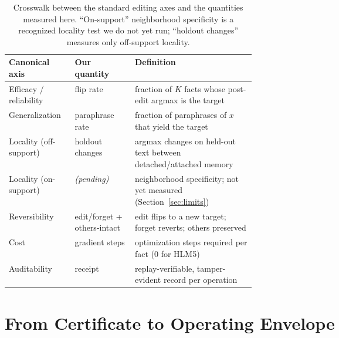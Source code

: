\documentclass[10pt,twocolumn]{article}
\theoremstyle{remark}
\begin{document}
\begin{table}[t]
\centering
\small
\begin{tabular}{@{}l l >{\raggedright\arraybackslash}p{0.49\linewidth}@{}}
\toprule
Canonical axis & Our quantity & Definition \\
\midrule
Efficacy / reliability & flip rate & fraction of $K$ facts whose post-edit argmax is the target \\
Generalization & paraphrase rate & fraction of paraphrases of $x$ that yield the target \\
Locality (off-support) & holdout changes & argmax changes on held-out text between detached/attached memory \\
Locality (on-support) & \emph{(pending)} & neighborhood specificity; not yet measured (Section~\ref{sec:limits}) \\
Reversibility & edit/forget + others-intact & edit flips to a new target; forget reverts; others preserved \\
Cost & gradient steps & optimization steps required per fact ($0$ for HLM5) \\
Auditability & receipt & replay-verifiable, tamper-evident record per operation \\
\bottomrule
\end{tabular}
\caption{Crosswalk between the standard editing axes and the quantities measured
here. ``On-support'' neighborhood specificity is a recognized locality test we do
not yet run; ``holdout changes'' measures only off-support locality.}
\label{tab:crosswalk}
\end{table}

\section{From Certificate to Operating Envelope}
\label{sec:envelope}
\end{document}
